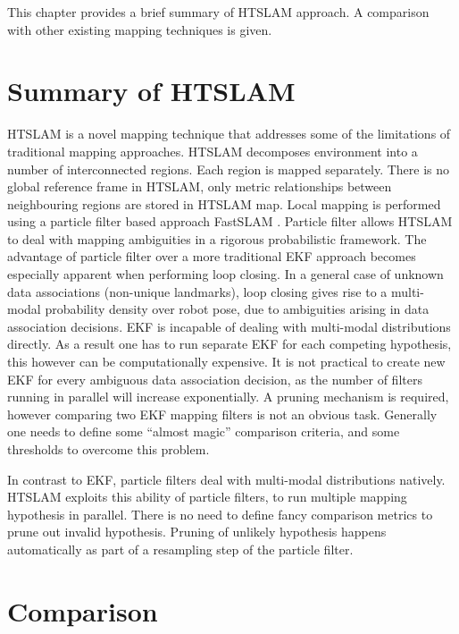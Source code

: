 This chapter provides a brief summary of HTSLAM approach. A comparison
with other existing mapping techniques is given. 


\section{Summary of HTSLAM}


HTSLAM is a novel mapping technique that addresses some of the
limitations of traditional mapping approaches. HTSLAM decomposes
environment into a number of interconnected regions. Each region is
mapped separately. There is no global reference frame in HTSLAM, only
metric relationships between neighbouring regions are stored in HTSLAM
map. Local mapping is performed using a particle filter based
approach FastSLAM \cite{fastslam, fastslam2}. Particle filter allows
HTSLAM to deal with mapping ambiguities in a rigorous probabilistic
framework. The advantage of particle filter over a more traditional
EKF approach becomes especially apparent when performing loop
closing. In a general case of unknown data associations (non-unique
landmarks), loop closing gives rise to a multi-modal probability
density over robot pose, due to ambiguities arising in data
association decisions. EKF is incapable of dealing with multi-modal
distributions directly. As a result one has to run separate EKF for
each competing hypothesis, this however can be computationally
expensive. It is not practical to create new EKF for every ambiguous
data association decision, as the number of filters running in
parallel will increase exponentially. A pruning mechanism is required,
however comparing two EKF mapping filters is not an obvious
task. Generally one needs to define some ``almost magic'' comparison
criteria, and some thresholds to overcome this problem.

In contrast to EKF, particle filters deal with multi-modal
distributions natively. HTSLAM exploits this ability of particle
filters, to run multiple mapping hypothesis in parallel. There is no
need to define fancy comparison metrics to prune out invalid
hypothesis. Pruning of unlikely hypothesis happens automatically as
part of a resampling step of the particle filter. 


\section{Comparison}

